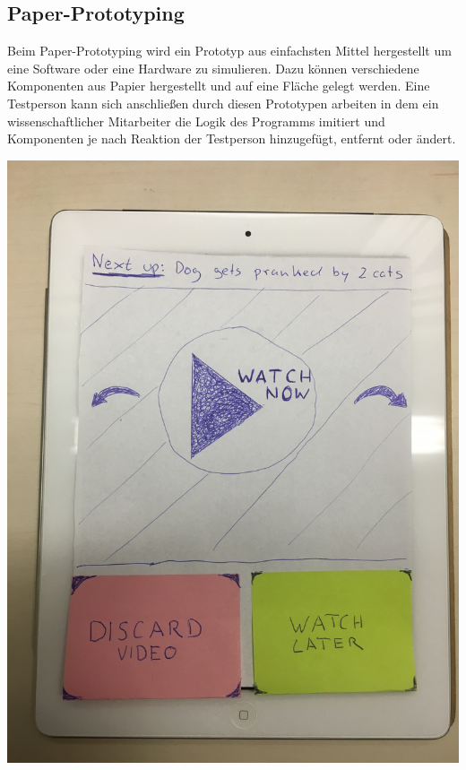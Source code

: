 \documentclass[a0,portrait]{a0poster}
\begin{document}
\begin{multicols}{2}
\subsection*{Paper-Prototyping}
Beim Paper-Prototyping wird ein Prototyp aus einfachsten Mittel hergestellt um eine Software oder eine Hardware zu simulieren. Dazu können verschiedene Komponenten aus Papier hergestellt und auf eine Fläche gelegt werden. Eine Testperson kann sich anschließen durch diesen Prototypen arbeiten in dem ein wissenschaftlicher Mitarbeiter die Logik des Programms imitiert und Komponenten je nach Reaktion der Testperson hinzugefügt, entfernt oder ändert.
\begin{center}\vspace{1cm}
\includegraphics[width=0.8\linewidth]{paper-prototype.jpg}
\end{center}\vspace{1cm}

\nocite{*} %
\end{multicols}
\end{document}
